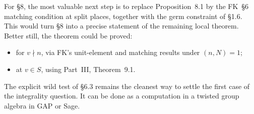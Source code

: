\documentclass[11pt]{article}
\begin{document}
For \S8, the most valuable next step is to replace Proposition~8.1 by
the FK~\S6 matching condition at split places, together with the germ
constraint of \S1.6. This would turn \S8 into a precise statement of the
remaining local theorem. Better still, the theorem could be proved:
\begin{itemize}
\item for $v\nmid n$, via FK's unit-element and matching results under
$(n,N)=1$;
\item at $v\in S$, using Part~III, Theorem~9.1.
\end{itemize}

The explicit wild test of \S6.3 remains the cleanest way to settle the
first case of the integrality question. It can be done as a computation
in a twisted group algebra in GAP or Sage.
\end{document}
